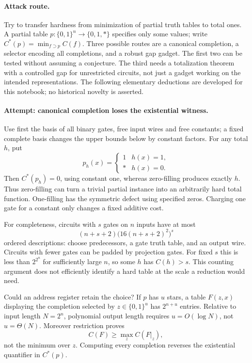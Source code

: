 \documentclass[11pt,a4paper]{article}
\numberwithin{equation}{section}
\begin{document}
\paragraph{Attack route.}
Try to transfer hardness from minimization of partial truth tables to total
ones. A partial table $p:\{0,1\}^n\to\{0,1,*\}$ specifies only some values;
write $C^*(p)=\min_{f\supset p}C(f)$. Three possible routes are a
canonical completion, a selector encoding all completions, and a robust gap
gadget. The first two can be tested without assuming a conjecture. The
third needs a totalization theorem with a controlled gap for unrestricted
circuits, not just a gadget working on the intended representations.
The following elementary deductions are developed for this notebook;
no historical novelty is asserted.

\paragraph{Attempt: canonical completion loses the existential witness.}
Use first the basis of all binary gates, free input wires and free constants;
a fixed complete basis changes the upper bounds below by constant factors.
For any total $h$, put
\[
 p_h(x)=\begin{cases}1&h(x)=1,\\ *&h(x)=0.\end{cases}
\]
Then $C^*(p_h)=0$, using constant one, whereas zero-filling produces exactly
$h$. Thus zero-filling can turn a trivial partial instance into an arbitrarily
hard total function. One-filling has the symmetric defect using specified
zeros. Charging one gate for a constant only changes a fixed additive cost.

For completeness, circuits with $s$ gates on $n$ inputs have at most
\[
 (n+s+2)\bigl(16(n+s+2)^2\bigr)^s
\]
ordered descriptions: choose predecessors, a gate truth table, and an output
wire. Circuits with fewer gates can be padded by projection gates. For fixed
$s$ this is less than $2^{2^n}$ for sufficiently large $n$, so some $h$ has
$C(h)>s$. This counting argument does not efficiently identify a hard table
at the scale a reduction would need.

Could an address register retain the choice? If $p$ has $u$ stars, a table
$F(z,x)$ displaying the completion selected by $z\in\{0,1\}^u$ has
$2^{n+u}$ entries. Relative to input length $N=2^n$, polynomial output length
requires $u=O(\log N)$, not $u=\Theta(N)$. Moreover restriction proves
\[
 C(F)\ge\max_z C(F|_z),
\]
not the minimum over $z$. Computing every completion reverses the
existential quantifier in $C^*(p)$.
\end{document}
